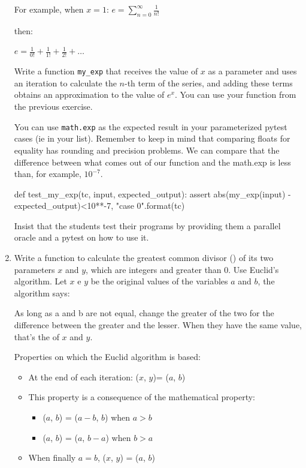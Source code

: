 \documentclass[
  fontsize=10pt,
  a4paper,
]{scrartcl}
\newenvironment{howTILEd}%
  {\begin{mdframed}[skipabove=10pt,skipbelow=10pt,backgroundcolor=pink!40]}%
  {\end{mdframed}}
\begin{document}
\begin{enumerate}
For example, when $x = 1$:
$
e =  \sum_{n=0}^{\infty} \frac{1}{n!}
$

then:

$
e = \frac{1}{0!} +  \frac{1}{1!} + \frac{1}{2!} +  \dots
$

Write a function \texttt{my\_exp} that receives the value of $x$ as a parameter and uses an iteration to calculate the $n$-th term of the series, and adding these terms obtains an approximation to the value of $e^x$. You can use your  function from the previous exercise.


You can use \texttt {math.exp} as the expected result in your parameterized pytest cases (ie in your  list). Remember to keep in mind that comparing floats for equality has rounding and precision problems. We can compare that the difference between what comes out of our function and the math.exp is less than, for example, $10^{-7}$.

\begin{small}
\begin{python}
def test_my_exp(tc, input, expected_output):
    assert abs(my_exp(input) - expected_output)<10**-7, "case {0}".format(tc)
\end{python}
\end{small}


\begin{howTILEd}
Insist that the students test their programs by providing them a parallel oracle and a pytest on how to use it.
\end{howTILEd}



\item Write a function to calculate the greatest common divisor () of its two parameters $x$ and $y$, which are integers and greater than 0.
%
Use Euclid's algorithm. Let $x$ e $y$ be the original values of the variables $a$ and $b$, the algorithm says:

As long as a and b are not equal, change the greater of the two for the difference between the greater and the lesser. When they have the same value, that's the  of $x$ and $y$.

Properties on which the Euclid algorithm is based:

\begin{itemize}
\item At the end of each iteration: ($x$, $y$)= ($a$, $b$) 
\item This property is a consequence of the mathematical property:
\begin{itemize}
\item  {}($a$, $b$) = ($a - b$, $b$) when $a > b$
\item {}($a$, $b$) = ($a$, $b - a$) when $b > a$ 
\end{itemize}
\item When finally $a = b$, ($x$, $y$) = ($a$, $b$)
\end{itemize}



\end{enumerate}
\end{document}

